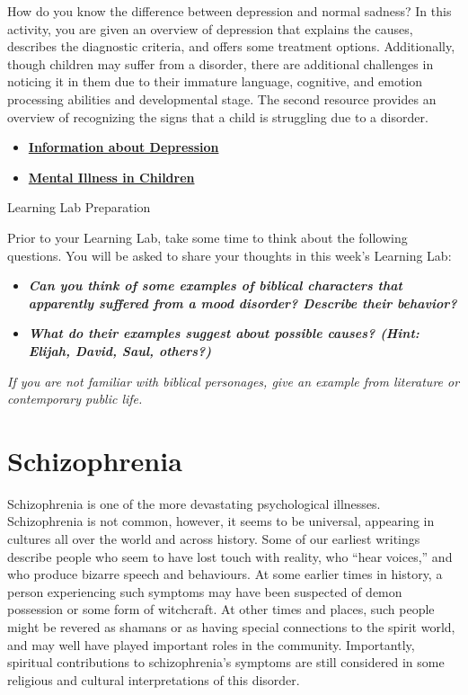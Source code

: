 \documentclass[
]{book}
\providecommand{\tightlist}{%
  \setlength{\itemsep}{0pt}\setlength{\parskip}{0pt}}
\begin{document}
\begin{reflect}
How do you know the difference between depression and normal sadness? In this activity, you are given an overview of depression that explains the causes, describes the diagnostic criteria, and offers some treatment options. Additionally, though children may suffer from a disorder, there are additional challenges in noticing it in them due to their immature language, cognitive, and emotion processing abilities and developmental stage. The second resource provides an overview of recognizing the signs that a child is struggling due to a disorder.

\begin{itemize}
\tightlist
\item
  \href{http://www.psychologyinfo.com/problems/depression.html}{\textbf{Information about Depression}}\\
\item
  \href{https://www.mayoclinic.org/healthy-lifestyle/childrens-health/in-depth/mental-illness-in-children/art-20046577}{\textbf{Mental Illness in Children}}
\end{itemize}

{Learning Lab Preparation}

Prior to your Learning Lab, take some time to think about the following questions. You will be asked to share your thoughts in this week's Learning Lab:

\begin{itemize}
\tightlist
\item
  \textbf{\emph{Can you think of some examples of biblical characters that apparently suffered from a mood disorder? Describe their behavior?}}\\
\item
  \textbf{\emph{What do their examples suggest about possible causes? (Hint: Elijah, David, Saul, others?)}}
\end{itemize}

\emph{If you are not familiar with biblical personages, give an example from literature or contemporary public life.}
\end{reflect}

\hypertarget{schizophrenia}{%
\section{Schizophrenia}\label{schizophrenia}}

Schizophrenia is one of the more devastating psychological illnesses. Schizophrenia is not common, however, it seems to be universal, appearing in cultures all over the world and across history. Some of our earliest writings describe people who seem to have lost touch with reality, who ``hear voices,'' and who produce bizarre speech and behaviours. At some earlier times in history, a person experiencing such symptoms may have been suspected of demon possession or some form of witchcraft. At other times and places, such people might be revered as shamans or as having special connections to the spirit world, and may well have played important roles in the community. Importantly, spiritual contributions to schizophrenia's symptoms are still considered in some religious and cultural interpretations of this disorder.
\end{document}
